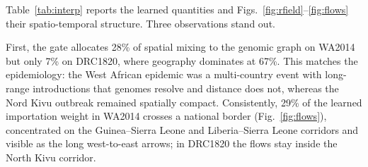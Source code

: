 \documentclass[conference]{IEEEtran}
\begin{document}
\begin{table}[t]
\caption{Learned quantities (mean over 5 seeds and all folds). $\beta_k$ is the suppression coefficient of response indicator $k$; the implied effect is the multiplicative reduction in $R$ per one-standard-deviation increase.}
\label{tab:interp}
\centering\footnotesize
{}

\end{table}

Table~\ref{tab:interp} reports the learned quantities and Figs.~\ref{fig:rfield}--\ref{fig:flows} their spatio-temporal structure. Three observations stand out.

First, the gate allocates 28\% of spatial mixing to the genomic graph on WA2014 but only 7\% on DRC1820, where geography dominates at 67\%. This matches the epidemiology: the West African epidemic was a multi-country event with long-range introductions that genomes resolve and distance does not, whereas the Nord Kivu outbreak remained spatially compact. Consistently, 29\% of the learned importation weight in WA2014 crosses a national border (Fig.~\ref{fig:flows}), concentrated on the Guinea--Sierra Leone and Liberia--Sierra Leone corridors and visible as the long west-to-east arrows; in DRC1820 the flows stay inside the North Kivu corridor.
\end{document}
